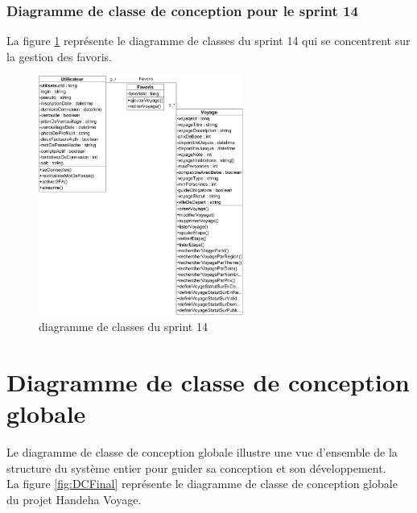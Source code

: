 \documentclass[12pt]{report}
\begin{document}
			\subsubsection{Diagramme de classe de conception pour le sprint 14}
				
			\hspace{15pt} La figure \ref{fig:sprint14} représente le diagramme de classes du sprint 14 qui se concentrent sur la gestion des favoris.


			\begin{figure}[h]
				\centering
				\includegraphics[width=0.6\textwidth]{sprint14.jpg}
				\caption{diagramme de classes du sprint 14}
				\label{fig:sprint14}
			\end{figure}
			\FloatBarrier


			\section{Diagramme de classe de conception globale}

			\hspace{15pt}Le diagramme de classe de conception globale illustre une vue d'ensemble de la structure du système entier pour guider sa conception et son développement.\\
				
			La figure \ref{fig:DCFinal} représente le diagramme de classe de conception globale du projet Handeha Voyage.
\end{document}
